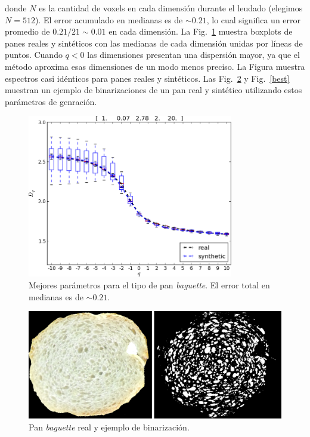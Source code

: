 donde $N$ es la cantidad de voxels en cada dimensión durante el leudado (elegimos $N = 512$). 
El error acumulado en medianas es de $\sim 0.21$, lo cual significa un error promedio de $0.21/21 \sim 0.01$ en cada dimensión.
La Fig.~\ref{bestboxplot} muestra boxplots de panes reales y sintéticos con las medianas de cada dimensión unidas por líneas de puntos.
Cuando $q < 0$ las dimensiones presentan una dispersión mayor, ya que el método aproxima esas dimensiones de un modo menos preciso.
La Figura muestra espectros casi idénticos para panes reales y sintéticos.
Las Fig.~\ref{realbin} y Fig.~\ref{best} muestran un ejemplo de binarizaciones de un pan real y sintético utilizando estos parámetros de genración.


\begin{figure}[!ht]
\includegraphics[width=9cm]{figures/bestboxplot}
\caption{Mejores parámetros para el tipo de pan {\em baguette}. El error total en medianas es de $\sim 0.21$.}
\label{bestboxplot}
\end{figure}

\begin{figure}[!ht]
\begin{center}
\includegraphics[width=13cm]{figures/realbin}
\caption{ Pan {\em baguette} real y ejemplo de binarización.}
\label{realbin}
\end{center}
\end{figure}

